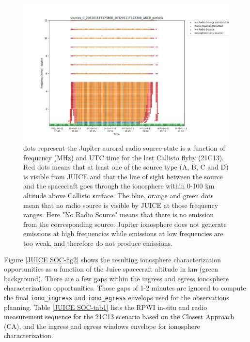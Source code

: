 \documentclass[referee]{aa}
\begin{document}
\begin{figure}
    \centering
    \includegraphics[width=\textwidth]{sources_C_20320111T173800_20320111T193300_ABCD_periods.png}
    \caption{dots represent the Jupiter auroral radio source state is a function of frequency (MHz) and UTC time for the last Callisto flyby (21C13). Red dots means that at least one of the source type (A, B, C and D) is visible from JUICE and that the line of sight between the source and the spacecraft goes through the ionosphere within 0-100 km altitude above Callisto surface. The blue, orange and green dots mean that no radio source is visible by JUICE at those frequency ranges. Here "No Radio Source" means that there is no emission from the corresponding source; Jupiter ionosphere does not generate emissions at high frequencies while emissions at low frequencies are too weak, and therefore do not produce emissions.}
    \label{JUICE SOC-fig1}
\end{figure}

Figure \ref{JUICE SOC-fig2} shows the resulting ionosphere characterization opportunities as a function of the Juice spacecraft altitude in km (green background). There are a few gaps within the ingress and egress ionosphere characterization opportunities. Those gaps of 1-2 minutes are ignored to compute the final \texttt{iono\_ingress} and \texttt{iono\_egress} envelops used for the observations planning. Table \ref{JUICE SOC-tab1} lists the RPWI in-situ and radio measurement sequence for the 21C13 scenario based on the Closest Approach (CA), and the ingress and egress windows envelope for ionosphere characterization. 
\end{document}
